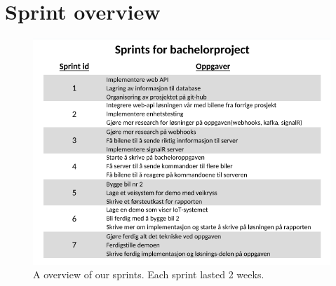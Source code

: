 \chapter{Sprint overview}
\begin{figure}[h!]
	\centering
	\includegraphics[width=1\linewidth]{figures/Sprint_overview}
	\caption[Sprint overview]{A overview of our sprints. Each sprint lasted 2 weeks.}
	\label{fig:sprintoverview}
\end{figure}